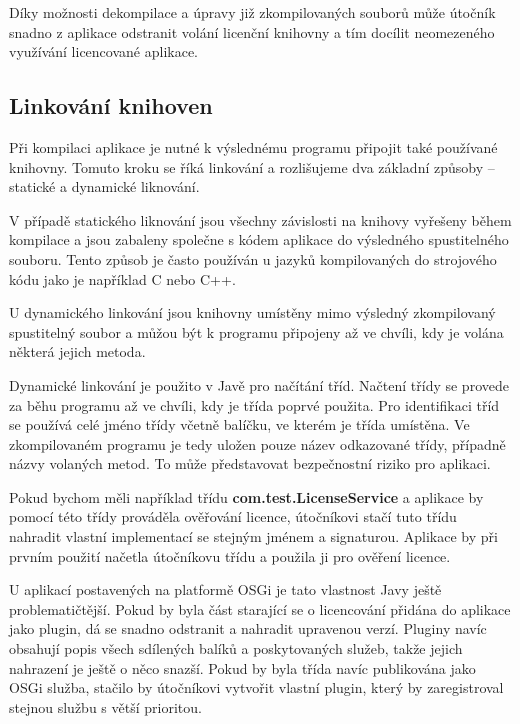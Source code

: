 \newpage

Díky možnosti dekompilace a úpravy již zkompilovaných souborů může útočník
snadno z aplikace odstranit volání licenční knihovny a tím docílit neomezeného
využívání licencované aplikace.

\subsection{Linkování knihoven}

Při kompilaci aplikace je nutné k výslednému programu připojit také používané
knihovny. Tomuto kroku se říká linkování a rozlišujeme dva základní způsoby –
statické a dynamické liknování.

V případě statického liknování jsou všechny závislosti na knihovy vyřešeny během
kompilace a jsou zabaleny společne s kódem aplikace do výsledného spustitelného
souboru. Tento způsob je často používán u jazyků kompilovaných do strojového
kódu jako je například C nebo C++.

U dynamického linkování jsou knihovny umístěny mimo výsledný zkompilovaný
spustitelný soubor a můžou být k programu připojeny až ve chvíli, kdy je volána
některá jejich metoda. 

Dynamické linkování je použito v Javě pro načítání tříd. Načtení třídy se
provede za běhu programu až ve chvíli, kdy je třída poprvé použita. Pro
identifikaci tříd se používá celé jméno třídy včetně balíčku, ve kterém je třída
umístěna. Ve zkompilovaném programu je tedy uložen pouze název odkazované třídy,
případně názvy volaných metod. To může představovat bezpečnostní riziko pro
aplikaci.

Pokud bychom měli například třídu \textbf{com.test.LicenseService} a aplikace by
pomocí této třídy prováděla ověřování licence, útočníkovi stačí tuto třídu
nahradit vlastní implementací se stejným jménem a signaturou. Aplikace by při
prvním použití načetla útočníkovu třídu a použila ji pro ověření licence.

U aplikací postavených na platformě \gls{OSGi} je tato vlastnost Javy ještě
problematičtější. Pokud by byla část starající se o licencování přidána do
aplikace jako plugin, dá se snadno odstranit a nahradit upravenou verzí. Pluginy
navíc obsahují popis všech sdílených balíků a poskytovaných služeb, takže jejich
nahrazení je ještě o něco snazší. Pokud by byla třída navíc publikována jako
\gls{OSGi} služba, stačilo by útočníkovi vytvořit vlastní plugin, který by
zaregistroval stejnou službu s větší prioritou.


